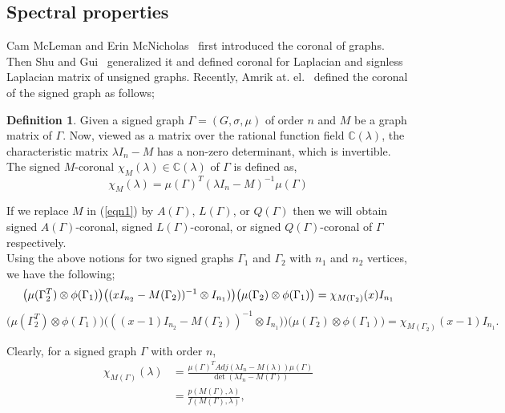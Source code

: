 \documentclass[12pt,a4paper]{article}
\theoremstyle{definition}
\newtheorem{definition}{Definition}[section]
\theoremstyle{remark}
\begin{document}
    \subsection{Spectral properties}
        Cam McLeman and Erin McNicholas~\cite{mcleman2011spectra} first introduced the coronal of graphs. Then Shu and Gui~\cite{cui2012spectrum} generalized it and defined coronal for Laplacian and signless Laplacian matrix of unsigned graphs. Recently, Amrik at. el.~\cite{Structuralbalanceandsignedgraphs_2025} defined the coronal of the signed graph as follows;
    \begin{definition}\cite{Structuralbalanceandsignedgraphs_2025}
        Given a signed graph $\Gamma=(G,\sigma,\mu)$ of order $n$ and $M$ be a graph matrix of $\Gamma$. Now, viewed as a matrix over the rational function field $\mathbb{C}(\lambda)$, the characteristic matrix $\lambda I_n-M$ has a non-zero determinant, which is invertible. The signed $M$-coronal $\chi_M(\lambda) \in \mathbb{C}(\lambda)$ of $\Gamma$ is defined as, 
        \begin{equation}\label{eqn1}
        \chi_M(\lambda)=\mu(\Gamma)^T(\lambda I_n-M)^{-1}\mu(\Gamma)
        \end{equation}
    \end{definition}
    If we replace $M$ in (\ref{eqn1}) by $A(\Gamma)$, $L(\Gamma)$, or $Q(\Gamma)$ then we will obtain signed $A(\Gamma)$-coronal, signed $L(\Gamma)$-coronal, or signed $Q(\Gamma)$-coronal of $\Gamma$ respectively.\\
    
    Using the above notions for two signed graphs $\Gamma_1$ and $\Gamma_2$ with $n_1$ and $n_2$ vertices, we have the following;\vspace{1pt}
   \begin{equation}\label{Eqn1}
           \big(\mu(\Gamma_2^T)\otimes\phi(\Gamma_1)\big)\big((xI_{n_2}-M(\Gamma_2))^{-1}\otimes I_{n_1})\big)\big(\mu(\Gamma_2)\otimes \phi(\Gamma_1)\big)=\chi_{M(\Gamma_2)}(x)I_{n_1} \vspace{2pt}
    \end{equation}
    \begin{equation}\label{Eqn2}
        \big(\mu(\Gamma_2^T)\otimes\phi(\Gamma_1)\big)\big(((x-1)I_{n_2}-M(\Gamma_2))^{-1}\otimes I_{n_1})\big)\big(\mu(\Gamma_2)\otimes \phi(\Gamma_1)\big)=\chi_{M(\Gamma_2)}(x-1)I_{n_1}.
    \end{equation}

    Clearly, for a signed graph $\Gamma$ with order $n$, \begin{equation}
        \begin{split}
            \chi_{M(\Gamma)}(\lambda)&=\frac{\mu(\Gamma)^TAdj(\lambda I_n-M(\lambda))\mu(\Gamma)}{\det(\lambda I_n-M(\Gamma))}\\
            &=\frac{p(M(\Gamma),\lambda)}{f(M(\Gamma),\lambda)},
        \end{split}
    \end{equation}
\end{document}

